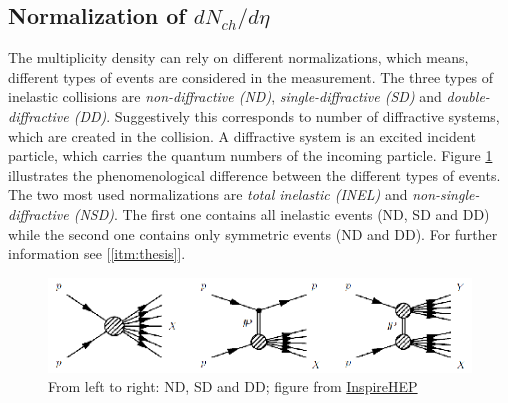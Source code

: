 \documentclass{article}
\newcommand\dNdEta{$dN_{ch}/d\eta$}
\begin{document}
\subsection{Normalization of \dNdEta}
The multiplicity density can rely on different normalizations, which means, different types of events are considered in the measurement.
The three types of inelastic collisions are \textit{non-diffractive (ND)}, \textit{single-diffractive (SD)} and \textit{double-diffractive (DD)}. Suggestively this corresponds to number of diffractive systems, which are created in the collision. A diffractive system is an excited incident particle, which carries the quantum numbers of the incoming particle. Figure \ref{fig:diff} illustrates the phenomenological difference between the different types of events. The two most used normalizations are \textit{total inelastic (INEL)} and \textit{non-single-diffractive (NSD)}. The first one contains all inelastic events (ND, SD and DD) while the second one contains only symmetric events (ND and DD). For further information see [\ref{itm:thesis}].
\begin{figure}
\centering
\includegraphics[width=\textwidth, natwidth=459, natheight=103]{images/diff.png}
\caption{From left to right: ND, SD and DD; figure from \href{www.inspirehep.net}{InspireHEP}}
\label{fig:diff}
\end{figure}
\end{document}
